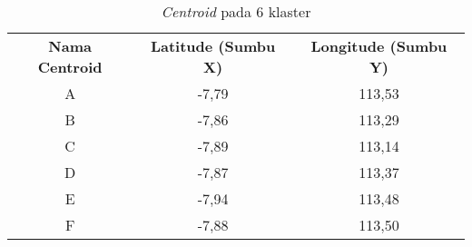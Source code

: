 \begin{table}[H]
\footnotesize
\centering
\begin{tabular}{ccc}
\rowcolor[HTML]{4472C4} 
{\color[HTML]{FFFFFF} \textbf{Nama   Centroid}} & {\color[HTML]{FFFFFF} \textbf{Latitude (Sumbu X)}} & {\color[HTML]{FFFFFF} \textbf{Longitude (Sumbu Y)}} \\
\rowcolor[HTML]{D9E1F2} 
A & -7,79 & 113,53 \\
B & -7,86 & 113,29 \\
\rowcolor[HTML]{D9E1F2} 
C & -7,89 & 113,14 \\
D & -7,87 & 113,37 \\
\rowcolor[HTML]{D9E1F2} 
E & -7,94 & 113,48 \\
F & -7,88 & 113,50
\end{tabular}
\caption{\textit{Centroid} pada 6 klaster}
\label{tab:center6}
\end{table}